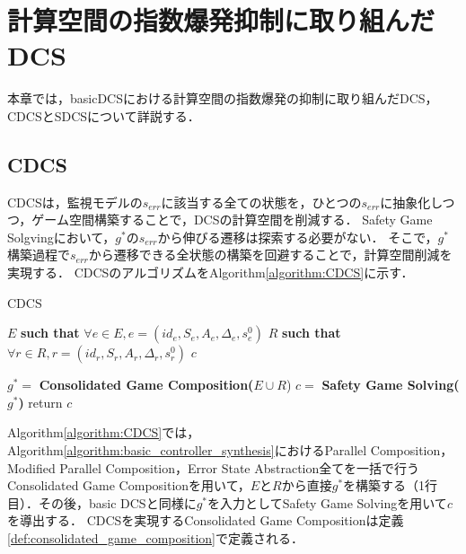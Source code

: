 \section{計算空間の指数爆発抑制に取り組んだDCS}
\label{section:advDCS}
本章では，basicDCSにおける計算空間の指数爆発の抑制に取り組んだDCS，CDCSとSDCSについて詳説する．


\subsection{CDCS}
\label{subsection:CDCS}
CDCS\cite{yamauchi:IPSJ2024}は，監視モデルの$s_{err}$に該当する全ての状態を，ひとつの$s_{err}$に抽象化しつつ，ゲーム空間構築することで，DCSの計算空間を削減する．
Safety Game Solgvingにおいて，$g^*$の$s_{err}$から伸びる遷移は探索する必要がない．
そこで，$g^*$構築過程で$s_{err}$から遷移できる全状態の構築を回避することで，計算空間削減を実現する．
CDCSのアルゴリズムをAlgorithm\ref{algorithm:CDCS}に示す．

\begin{algorithm}[h]
\caption{CDCS}
\label{algorithm:CDCS}
\begin{algorithmic}[1]
\renewcommand{\algorithmicrequire}{\textbf{Input:}}
\renewcommand{\algorithmicensure}{\textbf{Output:}}
\REQUIRE $E$ {\bf such that} $\forall e \in E, e = (id_{e}, S_{e}, A_{e}, \Delta_{e}, s^0_{e})$
\REQUIRE $R$ {\bf such that} $\forall r \in R, r = (id_{r}, S_{r}, A_{r}, \Delta_{r}, s^0_{r})$
\ENSURE  $c$

\STATE $g^* =$ {\bf Consolidated Game Composition($E \cup R$})
\STATE $c   =$ {\bf Safety Game Solving($g^*$)}
\STATE return $c$
\end{algorithmic}
\end{algorithm}

Algorithm\ref{algorithm:CDCS}では，Algorithm\ref{algorithm:basic_controller_synthesis}におけるParallel Composition，Modified Parallel Composition，Error State Abstraction全てを一括で行うConsolidated Game Compositionを用いて，$E$と$R$から直接$g^*$を構築する（1行目）．その後，basic DCSと同様に$g^*$を入力としてSafety Game Solvingを用いて$c$を導出する．
CDCSを実現するConsolidated Game Compositionは定義\ref{def:consolidated_game_composition}で定義される．

